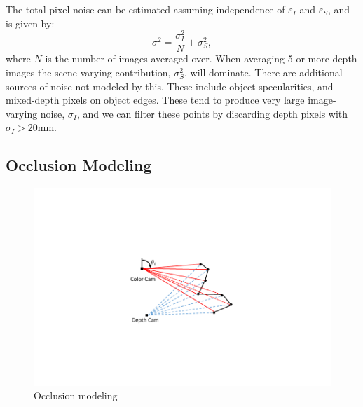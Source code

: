 The total pixel noise can be estimated assuming independence of $\varepsilon_I$ and $\varepsilon_S$, and is given by:
\begin{equation}
\sigma^2 = \frac{\sigma_I^2}{N} + \sigma_S^2,\label{eq:sigma}
\end{equation}
where $N$ is the number of images averaged over.  When averaging 5 or more depth images the scene-varying contribution, $\sigma_S^2$, will dominate.  There are additional sources of noise not modeled by this.  These include object specularities, and mixed-depth pixels on object edges.  These tend to produce very large image-varying noise, $\sigma_I$, and we can filter these points by discarding depth pixels with $\sigma_I>20$mm.  

\subsection{Occlusion Modeling}


\begin{figure}
\begin{center}
   \includegraphics[trim=130 90 140 90,clip,width=0.75\linewidth]{Figures/OcclusionModeling}
\end{center}
   \caption{Occlusion modeling }
\label{fig:occlusion}
\end{figure}


